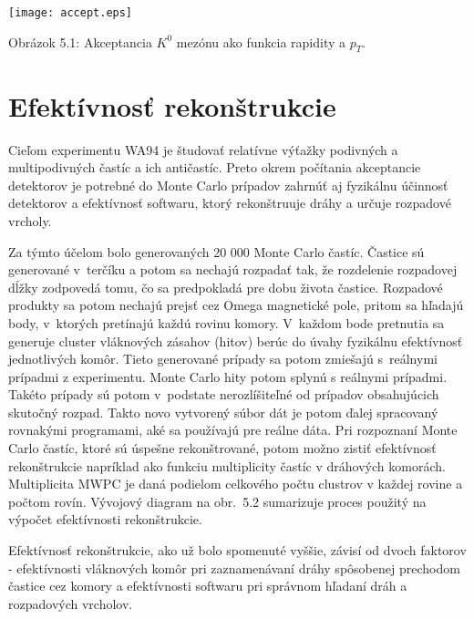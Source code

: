 \begin{center}
  \texttt{[image: accept.eps]}
\end{center}
\begin{center}
 Obrázok 5.1: Akceptancia $K^{0}$ mezónu ako funkcia rapidity a $p_{T}$.
\end{center}

\newpage
\section{Efektívnosť rekonštrukcie}
Cieľom experimentu WA94
je študovať relatívne výťažky podivných a multipodivných častíc a ich
antičastíc. Preto okrem počítania akceptancie detektorov je potrebné do
Monte Carlo prípadov zahrnúť aj fyzikálnu účinnosť detektorov
 a efektívnosť softwaru, ktorý rekonštruuje dráhy a
určuje rozpadové vrcholy.  

Za týmto účelom bolo generovaných 20 000 Monte Carlo častíc. Častice
sú  generované v~terčíku a potom sa nechajú rozpadať tak, že rozdelenie
rozpadovej dĺžky zodpovedá tomu, čo sa predpokladá pre
dobu života častice. Rozpadové produkty sa potom  nechajú prejsť cez Omega
magnetické pole, pritom sa  hľadajú body, v~ktorých pretínajú každú rovinu
komory. V~každom bode pretnutia sa generuje cluster vláknových zásahov
(hitov) berúc do úvahy fyzikálnu efektívnosť jednotlivých komôr. Tieto
generované prípady sa potom zmiešajú s~reálnymi prípadmi z experimentu. Monte
Carlo hity potom splynú s reálnymi prípadmi. Takéto prípady sú potom
v~podstate nerozlíšiteľné od prípadov obsahujúcich skutočný rozpad. Takto
novo vytvorený súbor dát je  potom ďalej spracovaný rovnakými programami, aké
sa používajú pre reálne dáta.  Pri rozpoznaní Monte Carlo častíc, ktoré sú
úspešne rekonštrované, potom možno zistiť efektívnosť rekonštrukcie 
napríklad ako  funkciu multiplicity  častíc v dráhových komorách. 
Multiplicita MWPC je daná podielom celkového počtu clustrov v každej rovine a
počtom rovín. Vývojový diagram na obr.~5.2
sumarizuje proces použitý na výpočet efektívnosti rekonštrukcie.

Efektívnosť rekonštrukcie, ako už bolo spomenuté vyššie, závisí od dvoch
faktorov - efektívnosti vláknových komôr pri zaznamenávaní dráhy spôsobenej
prechodom častice cez komory a efektívnosti softwaru pri správnom hľadaní
dráh a rozpadových vrcholov.

